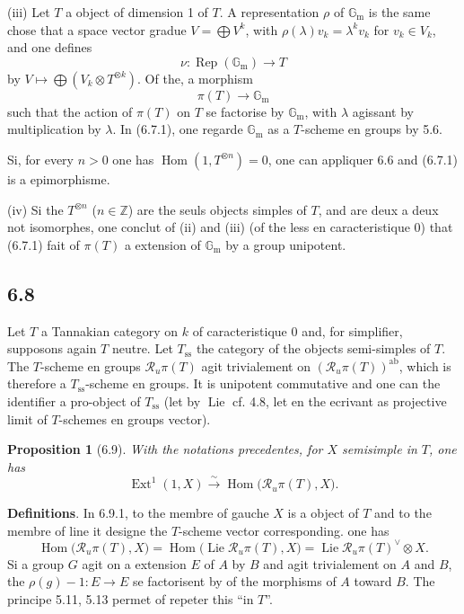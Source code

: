 \documentclass[12pt,a4paper]{article}
\theoremstyle{plain}
\newtheorem{proposition}[theorem]{Proposition}
\theoremstyle{definition}
\theoremstyle{remark}
\DeclareMathOperator{\Hom}{Hom}
\DeclareMathOperator{\Ext}{Ext}
\DeclareMathOperator{\Lie}{Lie}
\DeclareMathOperator{\Rep}{Rep}
\newcommand{\ab}{\mathrm{ab}}
\newcommand{\Z}{\mathbb{Z}}
\newcommand{\Gm}{\mathbb{G}_\mathrm{m}}
\begin{document}
(iii) Let $T$ a object of dimension 1 of $T$. A representation $\rho$ of $\Gm$ is the same chose that a space vector gradue $V = 
\bigoplus V^k$, with $\rho(\lambda)v_k = 
\lambda^k v_k$ for $v_k 
\in V_k$, and one defines
\[
\nu: 
\Rep(\Gm) 
\longrightarrow T
\]
by $V 
\mapsto 
\bigoplus (V_k 
\otimes T^{\otimes k})$. Of the, a morphism
\begin{equation*}\tag{6.7.1}
\pi(T) 
\longrightarrow 
\Gm
\end{equation*}
such that the action of $\pi(T)$ on $T$ se factorise by $\Gm$, with $\lambda$ agissant by multiplication by $\lambda$. In (6.7.1), one regarde $\Gm$ as a $T$-scheme en groups by 5.6.

Si, for every $n > 0$ one has $\Hom(1, T^{\otimes n}) = 0$, one can appliquer 6.6 and (6.7.1) is a epimorphisme.

(iv) Si the $T^{\otimes n}$ ($n 
\in 
\Z$) are the seuls objects simples of $T$, and are deux a deux not isomorphes, one conclut of (ii) and (iii) (of the less en caracteristique 0) that (6.7.1) fait of $\pi(T)$ a extension of $\Gm$ by a group unipotent.

\subsection*{6.8}
Let $T$ a Tannakian category on $k$ of caracteristique 0 and, for simplifier, supposons again $T$ neutre. Let $T_{\mathrm{ss}}$ the category of the objects semi-simples of $T$. The $T$-scheme en groups $\mathcal{R}_u\pi(T)$ agit trivialement on $(\mathcal{R}_u\pi(T))^{\ab}$, which is therefore a $T_{\mathrm{ss}}$-scheme en groups. It is unipotent commutative and one can the identifier a pro-object of $T_{\mathrm{ss}}$ (let by $\Lie$ cf. 4.8, let en the ecrivant as projective limit of $T$-schemes en groups vector).

\begin{proposition}[6.9]\label{prop:6.9}
With the notations precedentes, for $X$ semisimple in $T$, one has
\begin{equation*}\tag{6.9.1}
\Ext^1(1,X) 
\xrightarrow{\sim} 
\Hom\bigl(\mathcal{R}_u\pi(T), X\bigr).
\end{equation*}
\end{proposition}

\textbf{Definitions}. In 6.9.1, to the membre of gauche $X$ is a object of $T$ and to the membre of line it designe the $T$-scheme vector corresponding. one has
\[
\Hom\bigl(\mathcal{R}_u\pi(T), X\bigr) = 
\Hom\bigl(\Lie\mathcal{R}_u\pi(T), X\bigr) = 
\Lie\mathcal{R}_u\pi(T)^\vee 
\otimes X.
\]
Si a group $G$ agit on a extension $E$ of $A$ by $B$ and agit trivialement on $A$ and $B$, the $\rho(g)-1: E 
\to E$ se factorisent by of the morphisms of $A$ toward $B$. The principe 5.11, 5.13 permet of repeter this ``in $T$''.
\end{document}
